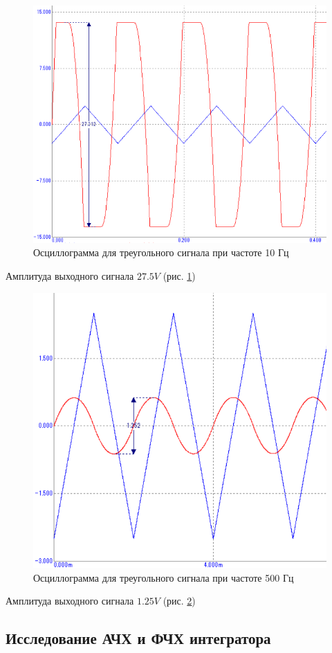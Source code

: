 \documentclass[a4paper,14pt]{article}
\begin{document}
\begin{figure}[H]
	\centering
	\includegraphics[width=0.7\linewidth]{../imgs/tran_triangle_10Hz}
	\caption{Осциллограмма для треугольного сигнала при частоте 10 Гц}
	\label{fig:tran_triangle_10Hz}
\end{figure}

Амплитуда выходного сигнала $27.5V$ (рис. \ref{fig:tran_triangle_10Hz})

\begin{figure}[H]
	\centering
	\includegraphics[width=0.7\linewidth]{../imgs/tran_triangle_500Hz}
	\caption{Осциллограмма для треугольного сигнала при частоте 500 Гц}
	\label{fig:tran_triangle_500Hz}
\end{figure}

Амплитуда выходного сигнала $1.25V$ (рис. \ref{fig:tran_triangle_500Hz})

\subsection{Исследование АЧХ и ФЧХ интегратора}
\end{document}
